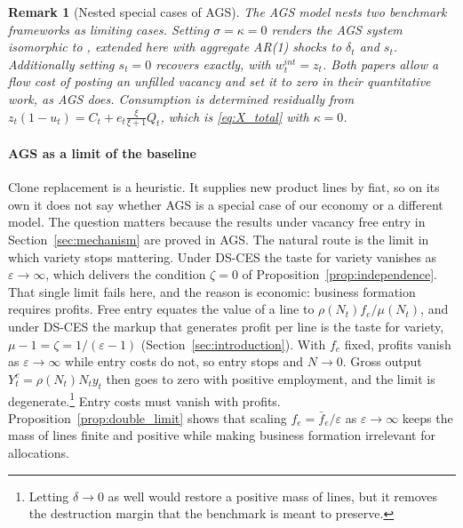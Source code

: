 \documentclass[authoryear, review, 12pt]{elsarticle}
\newtheorem{remark}{Remark}
\begin{document}
\begin{remark}[Nested special cases of AGS]
	\label{rem:nesting}
	The AGS model nests two benchmark frameworks as
	limiting cases. Setting $\sigma=\kappa=0$ renders
	the AGS system isomorphic to \citet{gabrovski_2025},
	extended here with aggregate AR(1) shocks to
	$\delta_t$ and $s_t$.
	Additionally setting $s_t=0$ recovers
	\citet{coles_2018} exactly, with $w_t^{int}=z_t$. Both papers allow a flow cost of
	posting an unfilled vacancy and set it to zero in their quantitative work, as AGS does.
	Consumption is determined residually from
	$z_t(1-u_t)=C_t+e_t\frac{\xi}{\xi+1}Q_t$, which is \eqref{eq:X_total} with $\kappa=0$.
\end{remark}
\paragraph{AGS as a limit of the baseline}
Clone replacement is a heuristic. It supplies new product lines by fiat, so on its own it
does not say whether AGS is a special case of our economy or a different model. The
question matters because the results under vacancy free entry in Section~\ref{sec:mechanism} are proved
in AGS. The natural route is the limit in which variety stops mattering. Under DS-CES the
taste for variety vanishes as $\varepsilon\to\infty$, which delivers the condition
$\zeta=0$ of Proposition~\ref{prop:independence}. That single limit fails here, and the
reason is economic: business formation requires profits. Free entry equates the value of
a line to $\rho(N_t)f_e/\mu(N_t)$, and under DS-CES the markup that generates profit per
line is the taste for variety, $\mu-1=\zeta=1/(\varepsilon-1)$
(Section~\ref{sec:introduction}). With $f_e$ fixed, profits vanish as
$\varepsilon\to\infty$ while entry costs do not, so entry stops and $N\to0$. Gross output
$Y_t^c=\rho(N_t)N_ty_t$ then goes to zero with positive employment, and the limit is
degenerate.\footnote{Letting $\delta\to0$ as well would restore a positive mass of lines,
but it removes the destruction margin that the benchmark is meant to preserve.} Entry
costs must vanish with profits. Proposition~\ref{prop:double_limit} shows that scaling
$f_e=\bar{f}_e/\varepsilon$ as $\varepsilon\to\infty$ keeps the mass of lines finite and
positive while making business formation irrelevant for allocations.
\end{document}
